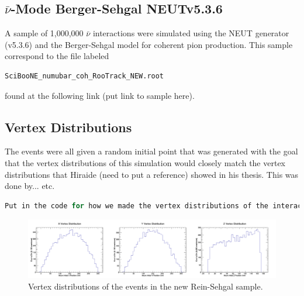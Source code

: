 \documentclass[11pt]{article}
\begin{document}
\subsection{$\bar{\nu}$-Mode Berger-Sehgal NEUTv5.3.6}
A sample of 1,000,000 $\bar{\nu}$ interactions were simulated using the NEUT generator (v5.3.6) and the Berger-Sehgal model for coherent pion production. This sample correspond to the file labeled
\begin{verbatim}
SciBooNE_numubar_coh_RooTrack_NEW.root
\end{verbatim}
found at the following link (put link to sample here).




\subsection{Vertex Distributions}
The events were all given a random initial point that was generated with the goal that the vertex distributions of this simulation would closely match the vertex distributions that Hiraide (need to put a reference) showed in his thesis. This was done by... etc.

\begin{lstlisting}[language=C]
Put in the code for how we made the vertex distributions of the interactions.
\end{lstlisting}

\begin{figure}[H]
\centering
\includegraphics[width=1.0\textwidth]{EventClassifications/VertexDistributions.png}
\caption{Vertex distributions of the events in the new Rein-Sehgal sample.}
\end{figure}






\end{document}
